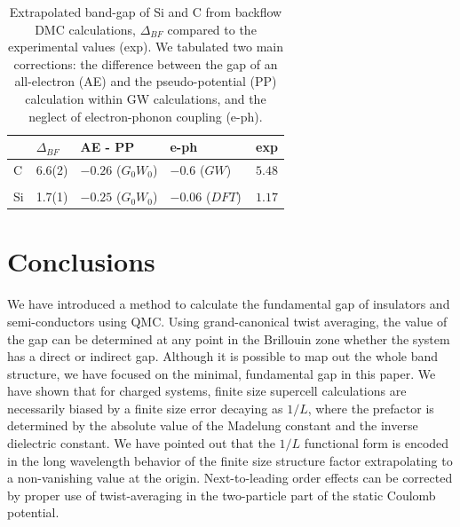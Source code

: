 \begin{table}
\caption{Extrapolated band-gap
of Si and C from backflow DMC calculations, $\Delta_{BF}$
compared to the experimental values (exp).
We tabulated two main corrections:
the difference  between the gap of an all-electron (AE) and the pseudo-potential (PP)
calculation within GW calculations, and
the neglect of electron-phonon coupling (e-ph).
\label{tab:c-si-gap-corr}}
\begin{tabular}{lllll}
\hline\hline
& $\Delta_{BF}$ & AE - PP & e-ph  & exp \\
\hline
C & 6.6(2) &   $-0.26$ ($G_0W_0$) \cite{GomezAbal08} & $-0.6$ ($GW$)~~\cite{Giustino10} & $5.48$ \cite{exp}\\
\hline \\
Si &  1.7(1)  & $-0.25$ ($G_0W_0$)\cite{GomezAbal08}  & $-0.06$ ($DFT$) \cite{Monserrat14} & $1.17$ \cite{exp} \\
\hline\hline
\end{tabular}
\end{table}


\section{Conclusions}
\label{sec:bg-conclude}

We have introduced a method to calculate the fundamental gap of insulators and semi-conductors
using QMC. Using grand-canonical twist averaging, 
the value of the gap can be determined at any point in the Brillouin zone whether the system has a direct or indirect gap. Although it is 
possible to map out the whole band structure, we have focused on the minimal, fundamental gap
in this paper. We have shown that for charged systems, finite size supercell calculations
are necessarily biased by a finite size error decaying as $1/L$, where the prefactor
is determined by the absolute value of the Madelung constant and the inverse dielectric constant.
We have pointed out that the $1/L$ functional form is encoded in the long wavelength behavior of
the finite size structure factor extrapolating to a non-vanishing value at the origin.
Next-to-leading order effects can be corrected by proper use of twist-averaging in the
two-particle part of the static Coulomb potential. 

